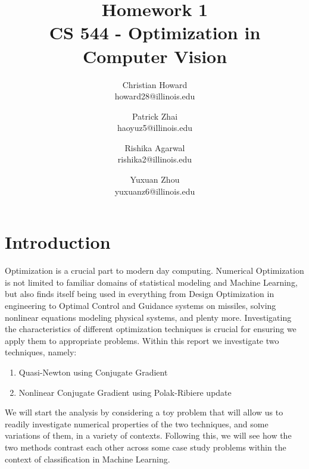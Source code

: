 
\newcommand{\pderiv}[2]{\frac{\partial #1}{\partial #2}}
\newcommand{\pderivv}[2]{\frac{\partial^2 #1}{\partial #2 ^2}}



\title{ Homework 1 \\ CS 544 - Optimization in Computer Vision }
\author{
	Christian Howard \\ howard28@illinois.edu
	\and
	Patrick Zhai \\ haoyuz5@illinois.edu
	\and
	Rishika Agarwal \\ rishika2@illinois.edu
	\and
	Yuxuan Zhou \\ yuxuanz6@illinois.edu
}


\maketitle

\section{Introduction}
Optimization is a crucial part to modern day computing. Numerical Optimization is not limited to familiar domains of statistical modeling and Machine Learning, but also finds itself being used in everything from Design Optimization in engineering to Optimal Control and Guidance systems on missiles, solving nonlinear equations modeling physical systems, and plenty more. Investigating the characteristics of different optimization techniques is crucial for ensuring we apply them to appropriate problems. Within this report we investigate two techniques, namely:

\begin{enumerate}
    \item Quasi-Newton using Conjugate Gradient \label{qncq}
    \item Nonlinear Conjugate Gradient using Polak-Ribiere update \label{pr}
\end{enumerate}

We will start the analysis by considering a toy problem that will allow us to readily investigate numerical properties of the two techniques, and some variations of them, in a variety of contexts. Following this, we will see how the two methods contrast each other across some case study problems within the context of classification in Machine Learning. 

